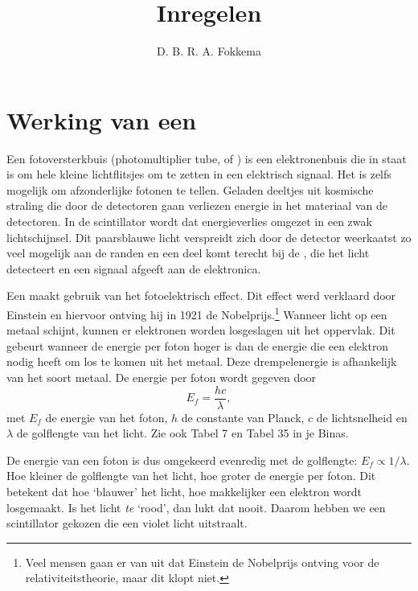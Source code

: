 



\title{Inregelen \pmts}
\author{D. B. R. A. Fokkema}
\date{}

\maketitle

\section{Werking van een \pmt}

Een fotoversterkbuis (photomultiplier tube, of \pmt) is een
elektronenbuis die in staat is om hele kleine lichtflitsjes om te zetten
in een elektrisch signaal.  Het is zelfs mogelijk om afzonderlijke fotonen
te tellen.  Geladen deeltjes uit kosmische straling die door de \hisparc
detectoren gaan verliezen energie in het materiaal van de detectoren.  In
de scintillator wordt dat energieverlies omgezet in een zwak
lichtschijnsel.  Dit paarsblauwe licht verspreidt zich door de detector
weerkaatst zo veel mogelijk aan de randen en een deel komt terecht bij de
\pmt, die het licht detecteert en een signaal afgeeft aan de \hisparc
elektronica.

Een \pmt maakt gebruik van het fotoelektrisch effect.  Dit effect werd
verklaard door Einstein en hiervoor ontving hij in 1921 de
Nobelprijs.\footnote{Veel mensen gaan er van uit dat Einstein de Nobelprijs
ontving voor de relativiteitstheorie, maar dit klopt niet.}  Wanneer licht
op een metaal schijnt, kunnen er elektronen worden losgeslagen uit het
oppervlak.  Dit gebeurt wanneer de energie per foton hoger is dan de
energie die een elektron nodig heeft om los te komen uit het metaal.  Deze
drempelenergie is afhankelijk van het soort metaal.  De energie per foton
wordt gegeven door
\begin{equation}
E_f = \frac{hc}{\lambda},
\end{equation}
met $E_f$ de energie van het foton, $h$ de constante van Planck, $c$ de
lichtsnelheid en $\lambda$ de golflengte van het licht.  Zie ook Tabel 7
en Tabel 35 in je Binas.

De energie van een foton is dus omgekeerd evenredig met de golflengte:
$E_f \propto 1/\lambda$.  Hoe kleiner de golflengte van het licht, hoe
groter de energie per foton.  Dit betekent dat hoe `blauwer' het licht,
hoe makkelijker een elektron wordt losgemaakt.  Is het licht \emph{te}
`rood', dan lukt dat nooit.  Daarom hebben we een scintillator gekozen die
een violet licht uitstraalt.

